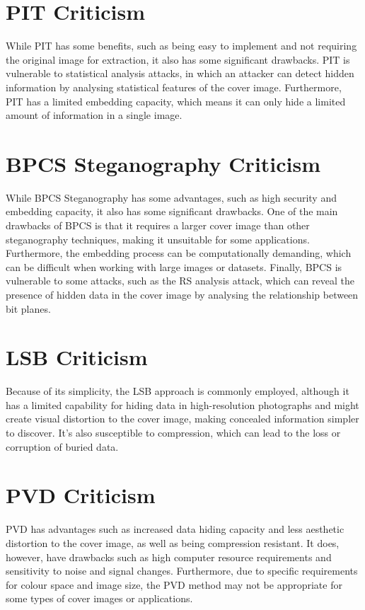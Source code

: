 \section{ PIT Criticism }
While PIT has some benefits, such as being easy to implement and not requiring the original image for extraction, it also has some significant drawbacks. PIT is vulnerable to statistical analysis attacks, in which an attacker can detect hidden information by analysing statistical features of the cover image. Furthermore, PIT has a limited embedding capacity, which means it can only hide a limited amount of information in a single image.

\section{ BPCS Steganography Criticism }
While BPCS Steganography has some advantages, such as high security and embedding capacity, it also has some significant drawbacks. One of the main drawbacks of BPCS is that it requires a larger cover image than other steganography techniques, making it unsuitable for some applications. Furthermore, the embedding process can be computationally demanding, which can be difficult when working with large images or datasets. Finally, BPCS is vulnerable to some attacks, such as the RS analysis attack, which can reveal the presence of hidden data in the cover image by analysing the relationship between bit planes.

\section{ LSB Criticism }
Because of its simplicity, the LSB approach is commonly employed, although it has a limited capability for hiding data in high-resolution photographs and might create visual distortion to the cover image, making concealed information simpler to discover. It's also susceptible to compression, which can lead to the loss or corruption of buried data.

\section{ PVD Criticism }
PVD has advantages such as increased data hiding capacity and less aesthetic distortion to the cover image, as well as being compression resistant. It does, however, have drawbacks such as high computer resource requirements and sensitivity to noise and signal changes. Furthermore, due to specific requirements for colour space and image size, the PVD method may not be appropriate for some types of cover images or applications.

